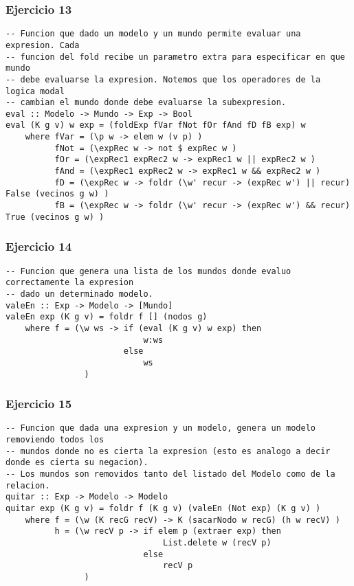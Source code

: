 \subsubsection*{Ejercicio 13}
\begin{lstlisting}
-- Funcion que dado un modelo y un mundo permite evaluar una expresion. Cada
-- funcion del fold recibe un parametro extra para especificar en que mundo 
-- debe evaluarse la expresion. Notemos que los operadores de la logica modal
-- cambian el mundo donde debe evaluarse la subexpresion.
eval :: Modelo -> Mundo -> Exp -> Bool
eval (K g v) w exp = (foldExp fVar fNot fOr fAnd fD fB exp) w
    where fVar = (\p w -> elem w (v p) )
          fNot = (\expRec w -> not $ expRec w ) 
          fOr = (\expRec1 expRec2 w -> expRec1 w || expRec2 w )
          fAnd = (\expRec1 expRec2 w -> expRec1 w && expRec2 w )
          fD = (\expRec w -> foldr (\w' recur -> (expRec w') || recur) False (vecinos g w) )
          fB = (\expRec w -> foldr (\w' recur -> (expRec w') && recur) True (vecinos g w) )		
\end{lstlisting}
\vspace{1cm}

\subsubsection*{Ejercicio 14}
\begin{lstlisting}
-- Funcion que genera una lista de los mundos donde evaluo correctamente la expresion
-- dado un determinado modelo.
valeEn :: Exp -> Modelo -> [Mundo]
valeEn exp (K g v) = foldr f [] (nodos g)
	where f = (\w ws -> if (eval (K g v) w exp) then 
							w:ws 
						else 
							ws	
				)	
\end{lstlisting}
\vspace{1cm}

\subsubsection*{Ejercicio 15}
\begin{lstlisting}
-- Funcion que dada una expresion y un modelo, genera un modelo removiendo todos los
-- mundos donde no es cierta la expresion (esto es analogo a decir donde es cierta su negacion).
-- Los mundos son removidos tanto del listado del Modelo como de la relacion.
quitar :: Exp -> Modelo -> Modelo
quitar exp (K g v) = foldr f (K g v) (valeEn (Not exp) (K g v) )
    where f = (\w (K recG recV) -> K (sacarNodo w recG) (h w recV) )
          h = (\w recV p -> if elem p (extraer exp) then 
								List.delete w (recV p)
							else
								recV p
				)	
\end{lstlisting}
\vspace{1cm}

